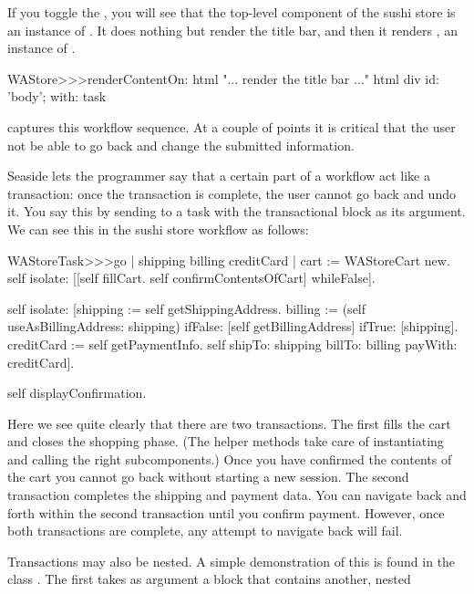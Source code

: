 \documentclass[a4paper,10pt,twoside]{book}
\begin{document}
{{If you toggle the , you will see that the top-level component of the sushi store is an instance of .
It does nothing but render the title bar, and then it renders , an instance of .

\begin{code}{}
WAStore>>>renderContentOn: html
	"... render the title bar ..."
	html div id: 'body'; with: task
\end{code}

 captures this workflow sequence. At a couple of points it is critical that the user not be able to go back and change the submitted information.


Seaside lets the programmer say that a certain part of a workflow act like a transaction: once the transaction is complete, the user cannot go back and undo it.
You say this by sending  to a task with the transactional block as its argument.
We can see this in the sushi store workflow as follows:

\begin{code}{}
WAStoreTask>>>go
	| shipping billing creditCard |
	cart := WAStoreCart new.
	self isolate:
		[[self fillCart.
		self confirmContentsOfCart]
			whileFalse].

	self isolate:
		[shipping := self getShippingAddress.
		billing := (self useAsBillingAddress: shipping)
					ifFalse: [self getBillingAddress]
					ifTrue: [shipping].
		creditCard := self getPaymentInfo.
		self shipTo: shipping billTo: billing payWith: creditCard].

	self displayConfirmation.
\end{code}

Here we see quite clearly that there are two transactions.
The first fills the cart and closes the shopping phase.
(The helper methods  \etc take care of instantiating and calling the right subcomponents.)
Once you have confirmed the contents of the cart you cannot go back without starting a new session.
The second transaction completes the shipping and payment data.
You can navigate back and forth within the second transaction until you confirm payment.
However, once both transactions are complete, any attempt to navigate back will fail.

Transactions may also be nested.
A simple demonstration of this is found in the class .
The first  takes as argument a block that contains another, nested 

}}
\end{document}

